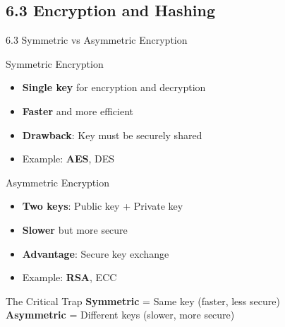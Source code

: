 \documentclass{beamer}
\begin{document}
	\subsection{6.3 Encryption and Hashing}
	\begin{frame}{6.3 Symmetric vs Asymmetric Encryption}
		\begin{block}{Symmetric Encryption}
			\begin{itemize}
				\item \textbf{Single key} for encryption and decryption
				\item \textbf{Faster} and more efficient
				\item \textbf{Drawback}: Key must be securely shared
				\item Example: \textbf{AES}, DES
			\end{itemize}
		\end{block}
		
		\begin{block}{Asymmetric Encryption}
			\begin{itemize}
				\item \textbf{Two keys}: Public key + Private key
				\item \textbf{Slower} but more secure
				\item \textbf{Advantage}: Secure key exchange
				\item Example: \textbf{RSA}, ECC
			\end{itemize}
		\end{block}
		
		\begin{alertblock}{The Critical Trap}
			\textbf{Symmetric} = Same key (faster, less secure) \\
			\textbf{Asymmetric} = Different keys (slower, more secure)
		\end{alertblock}
	\end{frame}
	
\end{document}

